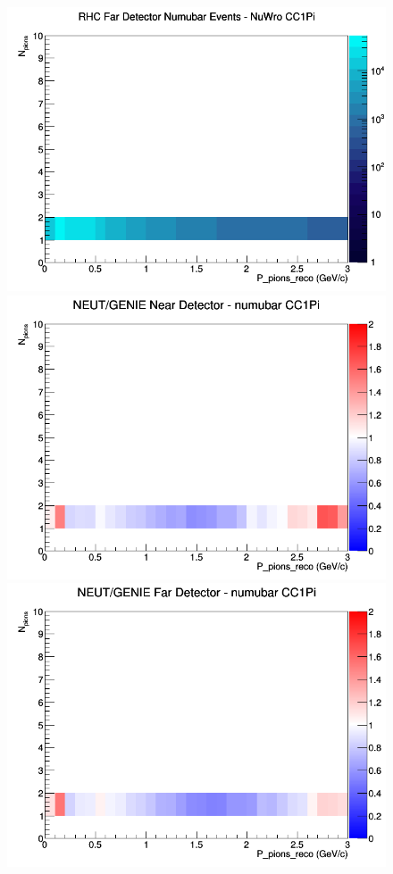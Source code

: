\documentclass[12pt]{article}
\begin{document}
\begin{figure}[h]
\endminipage
{}
\includegraphics[width=\linewidth]{eff_N_P/LAr/pions/CC1Pi_RHC_FD_numubar_N_P_NuWro.png}
\endminipage
\newline
{}
\includegraphics[width=\linewidth]{eff_N_P/LAr/pions/ratios/CC1Pi_NEUT_GENIE_numubar_near_N_P.png}
\endminipage
{}
\includegraphics[width=\linewidth]{eff_N_P/LAr/pions/ratios/CC1Pi_NEUT_GENIE_numubar_far_N_P.png}

\end{figure}
\end{document}
